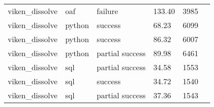 \begin{longtable}{lp{1.8cm}p{1.8cm}p{1.8cm}p{1.8cm}p{1.8cm}}
viken\_dissolve & oaf & failure & 133.40 & 3985 \\
viken\_dissolve & python & success & 68.23 & 6099 \\
viken\_dissolve & python & success & 86.32 & 6007 \\
viken\_dissolve & python & partial success & 89.98 & 6461 \\
viken\_dissolve & sql & partial success & 34.58 & 1553 \\
viken\_dissolve & sql & success & 34.72 & 1540 \\
viken\_dissolve & sql & partial success & 37.36 & 1543 \\
\end{longtable}
